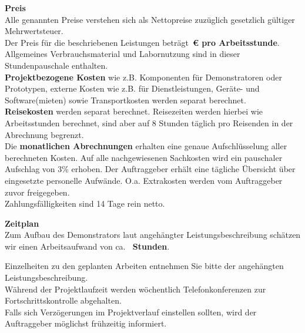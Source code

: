 {\Large\textbf{Preis}}\\\newline
Alle genannten Preise verstehen sich als Nettopreise zuzüglich gesetzlich gültiger Mehrwertsteuer.\\
Der Preis für die beschriebenen Leistungen beträgt \textbf{\stdPreis\,€ pro Arbeitsstunde}. Allgemeines Verbrauchsmaterial und Labornutzung sind in dieser Stundenpauschale enthalten.\\\newline
\textbf{Projektbezogene Kosten} wie z.B. Komponenten für Demonstratoren oder Prototypen, externe Kosten wie z.B. für Dienstleistungen, Geräte- und Software(mieten) sowie Transportkosten werden separat berechnet.\\\newline
\textbf{Reisekosten} werden separat berechnet. Reisezeiten werden hierbei wie Arbeitsstunden berechnet, sind aber auf 8 Stunden täglich pro Reisenden in der Abrechnung begrenzt.\\\newline
Die \textbf{monatlichen Abrechnungen} erhalten eine genaue Aufschlüsselung aller berechneten Kosten. Auf alle nachgewiesenen Sachkosten wird ein pauschaler Aufschlag von 3\% erhoben. Der Auftraggeber erhält eine tägliche Übersicht über eingesetzte personelle Aufwände. O.a. Extrakosten werden vom Auftraggeber zuvor freigegeben.\\\newline
Zahlungsfälligkeiten sind 14 Tage rein netto.\\\newline

{\Large\textbf{Zeitplan}}\\\newline
Zum Aufbau des Demonstrators laut angehängter Leistungsbeschreibung schätzen wir einen Arbeitsaufwand von ca. \textbf{\gesStd\, Stunden}.\newline

Einzelheiten zu den geplanten Arbeiten entnehmen Sie bitte der angehängten Leistungsbeschreibung. \\\newline
Während der Projektlaufzeit werden wöchentlich Telefonkonferenzen zur Fortschrittskontrolle abgehalten.\\\newline
Falls sich Verzögerungen im Projektverlauf einstellen sollten, wird der Auftraggeber möglichst frühzeitig informiert.\\\newline

